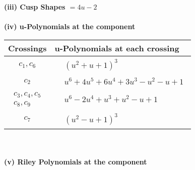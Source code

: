 \documentclass[1p]{elsarticle_modified}
\theoremstyle{definition}
\begin{document}
\flushleft \textbf{(iii) Cusp Shapes $= 4 u-2$}\\~\\
\newpage\renewcommand{\arraystretch}{1}
\flushleft \textbf{(iv) u-Polynomials at the component}\newline \\
\begin{tabular}{m{50pt}|m{274pt}}
Crossings & \hspace{64pt}u-Polynomials at each crossing \\
\hline $$\begin{aligned}c_{1},c_{6}\end{aligned}$$&$\begin{aligned}
&(u^2+u+1)^3
\end{aligned}$\\
\hline $$\begin{aligned}c_{2}\end{aligned}$$&$\begin{aligned}
&u^6+4 u^5+6 u^4+3 u^3- u^2- u+1
\end{aligned}$\\
\hline $$\begin{aligned}c_{3},c_{4},c_{5}\\c_{8},c_{9}\end{aligned}$$&$\begin{aligned}
&u^6-2 u^4+u^3+u^2- u+1
\end{aligned}$\\
\hline $$\begin{aligned}c_{7}\end{aligned}$$&$\begin{aligned}
&(u^2- u+1)^3
\end{aligned}$\\
\hline
\end{tabular}\\~\\
\newpage\renewcommand{\arraystretch}{1}
\flushleft \textbf{(v) Riley Polynomials at the component}\newline \\
\end{document}
